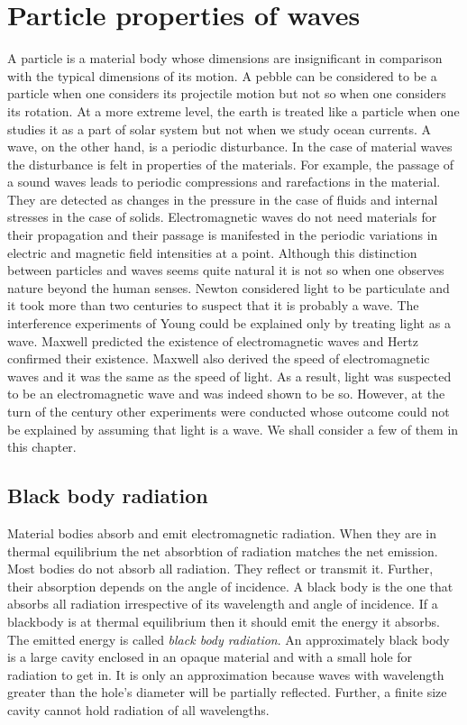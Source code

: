 \chapter{Particle properties of waves}\label{c2}
A particle is a material body whose dimensions are insignificant in comparison
with the typical dimensions of its motion. A pebble can be considered to be a
particle when one considers its projectile motion but not so when one considers
its rotation. At a more extreme level, the earth is treated like a particle when
one studies it as a part of solar system but not when we study ocean currents.
A wave, on the other hand, is a periodic disturbance. In the case of material
waves the disturbance is felt in properties of the materials. For example, the
passage of a sound waves leads to periodic compressions and rarefactions in the
material. They are detected as changes in the pressure in the case of fluids and
internal stresses in the case of solids. Electromagnetic waves do not need 
materials for their propagation and their passage is manifested in the periodic
variations in electric and magnetic field intensities at a point. Although this
distinction between particles and waves seems quite natural it is not so when 
one observes nature beyond the human senses. Newton considered light to be
particulate and it took more than two centuries to suspect that it is probably
a wave. The interference experiments of Young could be explained only by 
treating light as a wave. Maxwell predicted the existence of electromagnetic
waves and Hertz confirmed their existence. Maxwell also derived the speed of
electromagnetic waves and it was the same as the speed of light. As a result,
light was suspected to be an electromagnetic wave and was indeed shown to be so.
However, at the turn of the century other experiments were conducted whose 
outcome could not be explained by assuming that light is a wave. We shall 
consider a few of them in this chapter.

\section{Black body radiation}\label{c2s1}
Material bodies absorb and emit electromagnetic radiation. When they are in
thermal equilibrium the net absorbtion of radiation matches the net emission.
Most bodies do not absorb all radiation. They reflect or transmit it. Further,
their absorption depends on the angle of incidence. A black body is the one 
that absorbs all radiation irrespective of its wavelength and angle of 
incidence. If a blackbody is at thermal equilibrium then it should emit the
energy it absorbs. The emitted energy is called \emph{black body radiation}.
An approximately black body is a large cavity enclosed in an opaque material 
and with a small hole for radiation to get in. It is only an approximation 
because waves with wavelength greater than the hole's diameter will be 
partially reflected. Further, a finite size cavity cannot hold radiation of all
wavelengths.

